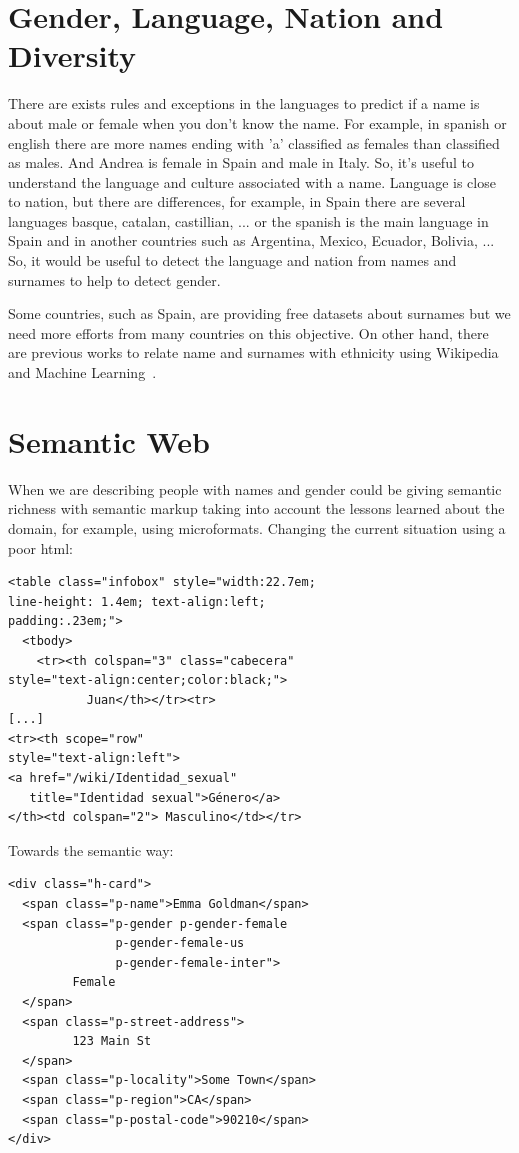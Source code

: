 \documentclass[a4paper]{article}
\begin{document}
\section{Gender, Language, Nation and Diversity}
\label{sec:diversity}

There are exists rules and exceptions in the languages to predict if a
name is about male or female when you don't know the name. For
example, in spanish or english there are more names ending with 'a'
classified as females than classified as males. And Andrea is female
in Spain and male in Italy. So, it's useful to understand the language
and culture associated with a name. Language is close to nation, but
there are differences, for example, in Spain there are several
languages basque, catalan, castillian, ... or the spanish is the main
language in Spain and in another countries such as Argentina, Mexico,
Ecuador, Bolivia, ... So, it would be useful to detect the language
and nation from names and surnames to help to detect gender.

Some countries, such as Spain, are providing free datasets about
surnames but we need more efforts from many countries on this
objective. On other hand, there are previous works to relate name and
surnames with ethnicity using Wikipedia and Machine
Learning~\cite{ambekar2009name}.


\section{Semantic Web}
\label{sec:semantic}

When we are describing people with names and gender could be giving
semantic richness with semantic markup taking into account the lessons
learned about the domain, for example, using microformats. Changing the
current situation using a poor html:

\begin{verbatim}
<table class="infobox" style="width:22.7em; 
line-height: 1.4em; text-align:left; 
padding:.23em;">
  <tbody>
    <tr><th colspan="3" class="cabecera"
style="text-align:center;color:black;">
           Juan</th></tr><tr>
[...]
<tr><th scope="row"
style="text-align:left">
<a href="/wiki/Identidad_sexual" 
   title="Identidad sexual">Género</a>
</th><td colspan="2"> Masculino</td></tr>
\end{verbatim}

Towards the semantic way:

\begin{verbatim}
<div class="h-card">
  <span class="p-name">Emma Goldman</span>
  <span class="p-gender p-gender-female 
               p-gender-female-us 
               p-gender-female-inter">
         Female
  </span>      
  <span class="p-street-address">
         123 Main St
  </span>
  <span class="p-locality">Some Town</span>
  <span class="p-region">CA</span>
  <span class="p-postal-code">90210</span>
</div>
\end{verbatim}
\end{document}
